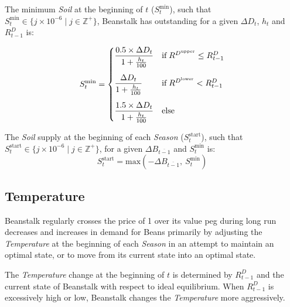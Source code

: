 \documentclass[tikz]{article}
\newcommand{\term}[1]{\textsl{#1}}
\newcommand{\Bean}{} %
\begin{document}
The minimum \term{Soil} at the beginning of $t$ ($S_t^{\text{min}}$), such that $S_t^{\text{min}} \in \{j \times 10^{-6} \mid j \in \mathbb{Z}^{+} \}$, Beanstalk has outstanding for a given $\Delta D_t$, $h_t$ and $R^D_{t-1}$ is:
\vspace*{2mm}

$$S_t^{\text{min}} = \begin{cases} \dfrac{0.5 \times \Delta D_t}{1 + \frac{h_t}{100}} & \text{if} \; R^{D^{\text{upper}}} \leq R^D_{t-1} \vspace{.3cm} \\ 
\dfrac{\Delta D_t}{1 + \frac{h_t}{100}} & \text{if} \; R^{D^{\text{lower}}} < R^D_{t-1} \vspace{.3cm} \\ 
\dfrac{1.5 \times \Delta D_t}{1 + \frac{h_t}{100}} & \text{else} \end{cases}$$

\vspace*{2mm}

The \term{Soil} supply at the beginning of each \term{Season} ($S_t^{\text{start}}$), such that $S_t^{\text{start}} \in \{j \times 10^{-6} \mid j \in \mathbb{Z}^{+} \}$, for a given $\Delta B_{\overline{t-1}}$ and $S_t^{\text{min}}$ is:
\vspace*{2mm}
$$S_t^{\text{start}} = \text{max}(-\Delta B_{\overline{t-1}},\ S_t^{\text{min}})$$

\vspace*{4mm}
\subsection{Temperature}
\vspace*{1mm}
Beanstalk regularly crosses the price of \Bean1 over its value peg during long run decreases and increases in demand for Beans primarily by adjusting the \term{Temperature} at the beginning of each \term{Season} in an attempt to maintain an optimal state, or to move from its current state into an optimal state.

The \term{Temperature} change at the beginning of $t$ is determined by $R^D_{t-1}$ and the current state of Beanstalk with respect to ideal equilibrium. When $R^D_{t-1}$ is excessively high or low, Beanstalk changes the \term{Temperature} more aggressively.
\end{document}
